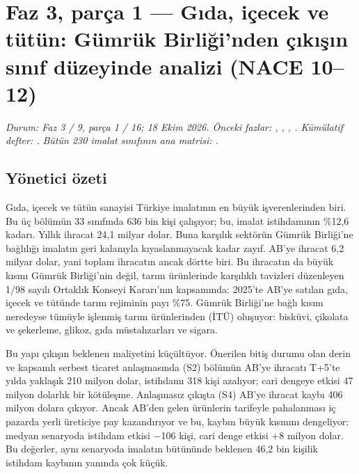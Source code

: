 \hypertarget{nace_kartlar_10-12}{%
\chapter{Faz 3, parça 1 --- Gıda, içecek ve tütün: Gümrük Birliği'nden çıkışın sınıf düzeyinde analizi (NACE 10--12)}\label{nace_kartlar_10-12}}

\emph{Durum: Faz 3 / 9, parça 1 / 16; 18 Ekim 2026. Önceki fazlar: , , , . Kümülatif defter: . Bütün 230 imalat sınıfının ana matrisi: \href{../veri/nace_matris.csv}{}.}

\hypertarget{nace_kartlar_10-12-yuxf6netici-uxf6zeti}{%
\section{Yönetici özeti}\label{nace_kartlar_10-12-yuxf6netici-uxf6zeti}}

Gıda, içecek ve tütün sanayisi Türkiye imalatının en büyük işverenlerinden biri. Bu üç bölümün 33 sınıfında 636 bin kişi çalışıyor; bu, imalat istihdamının \%12,6 kadarı. Yıllık ihracat 24,1 milyar dolar. Buna karşılık sektörün Gümrük Birliği'ne bağlılığı imalatın geri kalanıyla kıyaslanmayacak kadar zayıf. AB'ye ihracat 6,2 milyar dolar, yani toplam ihracatın ancak dörtte biri. Bu ihracatın da büyük kısmı Gümrük Birliği'nin değil, tarım ürünlerinde karşılıklı tavizleri düzenleyen 1/98 sayılı Ortaklık Konseyi Kararı'nın kapsamında: 2025'te AB'ye satılan gıda, içecek ve tütünde tarım rejiminin payı \%75. Gümrük Birliği'ne bağlı kısım neredeyse tümüyle işlenmiş tarım ürünlerinden (İTÜ) oluşuyor: bisküvi, çikolata ve şekerleme, glikoz, gıda müstahzarları ve sigara.

Bu yapı çıkışın beklenen maliyetini küçültüyor. Önerilen bitiş durumu olan derin ve kapsamlı serbest ticaret anlaşmasında (S2) bölümün AB'ye ihracatı T+5'te yılda yaklaşık 210 milyon dolar, istihdamı 318 kişi azalıyor; cari dengeye etkisi 47 milyon dolarlık bir kötüleşme. Anlaşmasız çıkışta (S4) AB'ye ihracat kaybı 406 milyon dolara çıkıyor. Ancak AB'den gelen ürünlerin tarifeyle pahalanması iç pazarda yerli üreticiye pay kazandırıyor ve bu, kaybın büyük kısmını dengeliyor: medyan senaryoda istihdam etkisi −106 kişi, cari denge etkisi +8 milyon dolar. Bu değerler, aynı senaryoda imalatın bütününde beklenen 46,2 bin kişilik istihdam kaybının yanında çok küçük.

